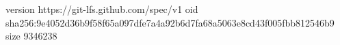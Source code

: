 version https://git-lfs.github.com/spec/v1
oid sha256:9e4052d36b9f58f65a097dfe7a4a92b6d7fa68a5063e8cd43f005fbb812546b9
size 9346238
